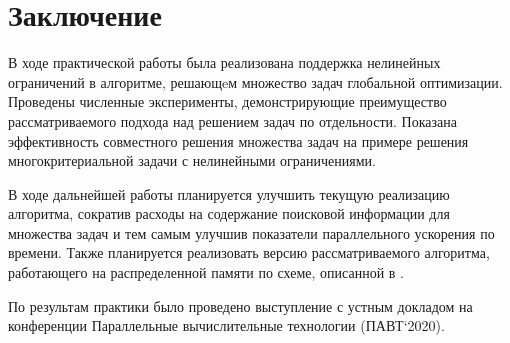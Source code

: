 \section{Заключение}

В ходе практической работы была реализована поддержка нелинейных ограничений в алгоритме, решающeм
множество задач глобальной оптимизации. Проведены численные эксперименты, демонстрирующие
преимущество рассматриваемого подхода над решением задач по отдельности. Показана эффективность
совместного решения множества задач на примере решения многокритериальной задачи с
нелинейными ограничениями.

В ходе дальнейшей работы планируется улучшить текущую реализацию алгоритма,
сократив расходы на содержание поисковой информации для множества задач и тем самым улучшив
показатели параллельного ускорения по времени. Также планируется реализовать версию
рассматриваемого алгоритма, работающего на распределенной памяти по схеме, описанной в \cite{BarkalovLebedev2017_2}.

По результам практики было проведено выступление с устным докладом на конференции Параллельные вычислительные технологии (ПАВТ`2020).
